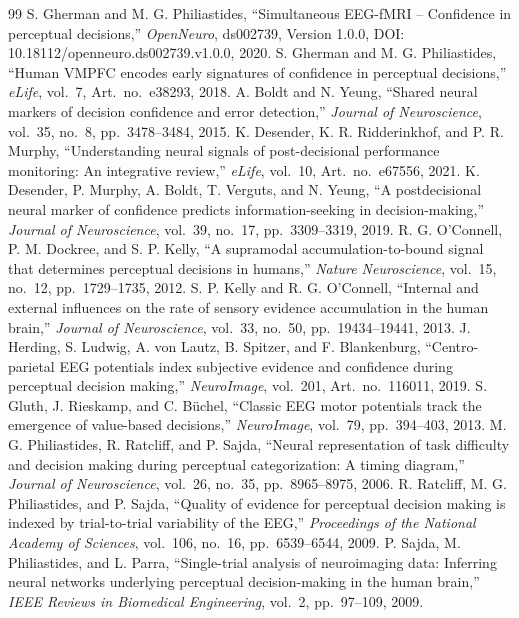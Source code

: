 \documentclass[11pt,a4paper]{article}
\begin{document}
\begin{thebibliography}{99}
 S. Gherman and M. G. Philiastides, ``Simultaneous EEG-fMRI -- Confidence in perceptual decisions,'' \textit{OpenNeuro}, ds002739, Version 1.0.0, DOI: 10.18112/openneuro.ds002739.v1.0.0, 2020.
 S. Gherman and M. G. Philiastides, ``Human VMPFC encodes early signatures of confidence in perceptual decisions,'' \textit{eLife}, vol.~7, Art.~no.~e38293, 2018.
 A. Boldt and N. Yeung, ``Shared neural markers of decision confidence and error detection,'' \textit{Journal of Neuroscience}, vol.~35, no.~8, pp.~3478--3484, 2015.
 K. Desender, K. R. Ridderinkhof, and P. R. Murphy, ``Understanding neural signals of post-decisional performance monitoring: An integrative review,'' \textit{eLife}, vol.~10, Art.~no.~e67556, 2021.
 K. Desender, P. Murphy, A. Boldt, T. Verguts, and N. Yeung, ``A postdecisional neural marker of confidence predicts information-seeking in decision-making,'' \textit{Journal of Neuroscience}, vol.~39, no.~17, pp.~3309--3319, 2019.
 R. G. O'Connell, P. M. Dockree, and S. P. Kelly, ``A supramodal accumulation-to-bound signal that determines perceptual decisions in humans,'' \textit{Nature Neuroscience}, vol.~15, no.~12, pp.~1729--1735, 2012.
 S. P. Kelly and R. G. O'Connell, ``Internal and external influences on the rate of sensory evidence accumulation in the human brain,'' \textit{Journal of Neuroscience}, vol.~33, no.~50, pp.~19434--19441, 2013.
 J. Herding, S. Ludwig, A. von Lautz, B. Spitzer, and F. Blankenburg, ``Centro-parietal EEG potentials index subjective evidence and confidence during perceptual decision making,'' \textit{NeuroImage}, vol.~201, Art.~no.~116011, 2019.
 S. Gluth, J. Rieskamp, and C. B\"uchel, ``Classic EEG motor potentials track the emergence of value-based decisions,'' \textit{NeuroImage}, vol.~79, pp.~394--403, 2013.
 M. G. Philiastides, R. Ratcliff, and P. Sajda, ``Neural representation of task difficulty and decision making during perceptual categorization: A timing diagram,'' \textit{Journal of Neuroscience}, vol.~26, no.~35, pp.~8965--8975, 2006.
 R. Ratcliff, M. G. Philiastides, and P. Sajda, ``Quality of evidence for perceptual decision making is indexed by trial-to-trial variability of the EEG,'' \textit{Proceedings of the National Academy of Sciences}, vol.~106, no.~16, pp.~6539--6544, 2009.
 P. Sajda, M. Philiastides, and L. Parra, ``Single-trial analysis of neuroimaging data: Inferring neural networks underlying perceptual decision-making in the human brain,'' \textit{IEEE Reviews in Biomedical Engineering}, vol.~2, pp.~97--109, 2009.

\end{thebibliography}
\end{document}
